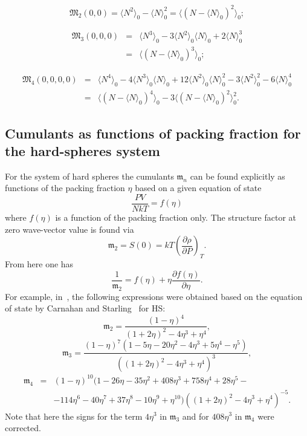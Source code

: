 \begin{equation}
	\mathfrak{M}_2(0,0) = \langle N^2 \rangle_0 - \langle N \rangle_0^2 = \langle (N - \langle N \rangle_0)^2 \rangle_0;
\end{equation}

\begin{eqnarray}
	\mathfrak{M}_3(0,0,0) &=& \langle N^3 \rangle_0 - 3 \langle N^2 \rangle_0 \langle N \rangle_0 +2\langle N \rangle_0^3
	\nonumber\\
	&=& \langle (N - \langle N \rangle_0)^3 \rangle_0;
\end{eqnarray}

\begin{eqnarray}
	\mathfrak{M}_4(0,0,0,0) &=& \langle N^4 \rangle_0 
	- 4\langle N^3 \rangle_0\langle N \rangle_0 
	+ 12\langle N^2 \rangle_0\langle N \rangle_0^2 
	- 3\langle N^2 \rangle_0^2 
	- 6\langle N \rangle_0^4
	\nonumber\\
	&=& \langle (N - \langle N \rangle_0)^4 \rangle_0 - 3 \langle (N - \langle N \rangle_0)^2 \rangle_0^2.
\end{eqnarray}

\subsection{Cumulants as functions of packing fraction for the hard-spheres system}
For the system of hard spheres the cumulants $\mathfrak{m}_n$ can be found explicitly as functions of the packing fraction $\eta$ based on a given equation of state
\begin{equation}
	\frac{PV}{NkT} = f(\eta)
\end{equation}
where $f(\eta)$ is a function of the packing fraction only. The structure factor at zero wave-vector value is found via
\begin{equation}
	\mathfrak{m}_2 = S(0) = kT\left(\frac{\partial \rho}{\partial P}\right)_T.
\end{equation}
From here one has
\begin{equation}
	\frac{1}{\mathfrak{m}_2} = f(\eta) + \eta \frac{\partial f(\eta)}{\partial \eta}.
\end{equation}
For example, in~\cite{Idzik1987En}, the following expressions were obtained based on the equation of state by Carnahan and Starling~\cite{CarnahanStarling1969} for HS:
\begin{equation}
	\mathfrak{m}_2 = \frac{(1-\eta)^4}{(1+2\eta)^2 - 4\eta^3 + \eta^4},
	\nonumber
\end{equation}
\begin{equation}
	\mathfrak{m}_3 = \frac{(1-\eta)^7(1 - 5\eta - 20\eta^2 - 4\eta^3 + 5\eta^4 - \eta^5)}{((1+2\eta)^2 - 4\eta^3 + \eta^4)^3},
	\nonumber
\end{equation}
\begin{eqnarray}
	\mathfrak{m}_4 &=& (1-\eta)^{10}(1 - 26 \eta - 35\eta^2 + 408\eta^3 + 758\eta^4 + 28\eta^5 -
	\nonumber\\
	&&-114\eta^6 - 40\eta^7 + 37\eta^8 - 10\eta^9 + \eta^{10}) ((1+2\eta)^2 - 4\eta^3 + \eta^4)^{-5}.
	\nonumber
\end{eqnarray}
Note that here the signs for the term $4\eta^3$ in $\mathfrak{m}_3$ and for $408\eta^3$ in $\mathfrak{m}_4$ were corrected.